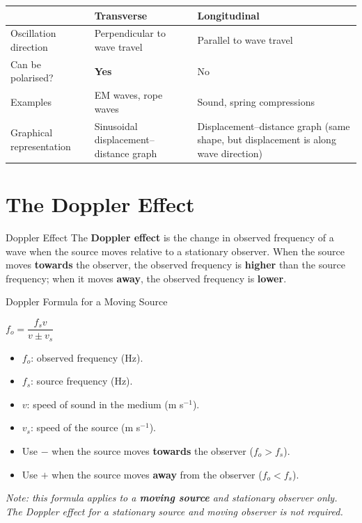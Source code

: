 \begin{center}
\renewcommand{\arraystretch}{1.4}
\begin{tabular}{@{} l p{4.5cm} p{4.5cm} @{}}
\toprule
 & \textbf{Transverse} & \textbf{Longitudinal} \\
\midrule
Oscillation direction & Perpendicular to wave travel & Parallel to wave travel \\
Can be polarised? & \textbf{Yes} & No \\
Examples & EM waves, rope waves & Sound, spring compressions \\
Graphical representation & Sinusoidal displacement--distance graph & Displacement--distance graph (same shape, but displacement is along wave direction) \\
\bottomrule
\end{tabular}
\end{center}

\pagebreak



\section{The Doppler Effect}

\begin{definitionbox}{Doppler Effect}
The \textbf{Doppler effect} is the change in observed frequency of a wave when the source moves relative to a stationary observer. When the source moves \textbf{towards} the observer, the observed frequency is \textbf{higher} than the source frequency; when it moves \textbf{away}, the observed frequency is \textbf{lower}.
\end{definitionbox}

\begin{formulabox}{Doppler Formula for a Moving Source}
\begin{center}
\Large $f_o = \dfrac{f_s v}{v \pm v_s}$
\end{center}
\vspace{0.3em}
\begin{itemize}[itemsep=2pt]
  \item $f_o$: observed frequency (Hz).
  \item $f_s$: source frequency (Hz).
  \item $v$: speed of sound in the medium (m s$^{-1}$).
  \item $v_s$: speed of the source (m s$^{-1}$).
  \item Use $\mathbf{-}$ when the source moves \textbf{towards} the observer ($f_o > f_s$).
  \item Use $\mathbf{+}$ when the source moves \textbf{away} from the observer ($f_o < f_s$).
\end{itemize}
\vspace{0.3em}
\textit{Note: this formula applies to a \textbf{moving source} and stationary observer only. The Doppler effect for a stationary source and moving observer is not required.}
\end{formulabox}

